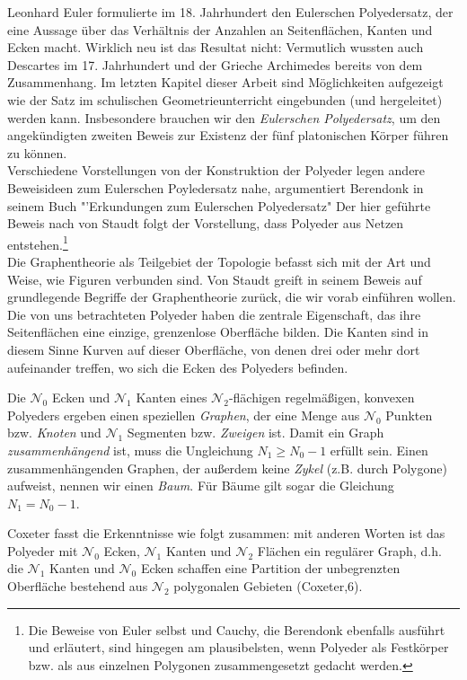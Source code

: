 Leonhard Euler formulierte im 18. Jahrhundert den Eulerschen Polyedersatz, der eine Aussage über das Verhältnis der Anzahlen an Seitenflächen, Kanten und Ecken macht. Wirklich neu ist das Resultat nicht: Vermutlich wussten auch Descartes im 17. Jahrhundert und der Grieche Archimedes bereits von dem Zusammenhang. Im letzten Kapitel dieser Arbeit sind Möglichkeiten aufgezeigt wie der Satz im schulischen Geometrieunterricht eingebunden (und hergeleitet) werden kann. Insbesondere brauchen wir den \textit{Eulerschen Polyedersatz}, um den angekündigten zweiten Beweis zur Existenz der fünf platonischen Körper führen zu können.\\
Verschiedene Vorstellungen von der Konstruktion der Polyeder legen andere Beweisideen zum Eulerschen Poyledersatz nahe, argumentiert Berendonk in seinem Buch "'Erkundungen zum Eulerschen Polyedersatz" \citep[vgl.][39]{Berendonk2014} Der hier geführte Beweis nach von Staudt folgt der Vorstellung, dass Polyeder aus Netzen entstehen.\footnote{Die Beweise von Euler selbst und Cauchy, die Berendonk ebenfalls ausführt und erläutert, sind hingegen am plausibelsten, wenn Polyeder als Festkörper bzw. als aus einzelnen Polygonen zusammengesetzt gedacht werden.}\\
Die Graphentheorie als Teilgebiet der Topologie befasst sich mit der Art und Weise, wie Figuren verbunden sind. Von Staudt greift in seinem Beweis auf grundlegende Begriffe der Graphentheorie zurück, die wir vorab einführen wollen. Die von uns betrachteten Polyeder haben die zentrale Eigenschaft, das ihre Seitenflächen eine einzige, grenzenlose Oberfläche bilden. Die Kanten sind in diesem Sinne Kurven auf dieser Oberfläche, von denen drei oder mehr dort aufeinander treffen, wo sich die Ecken des Polyeders befinden. 
\begin{bem} 
Die $\mathcal{N}_0$ Ecken und $\mathcal{N}_1$ Kanten eines $\mathcal{N}_2$-flächigen regelmäßigen, konvexen Polyeders ergeben einen speziellen \textit{Graphen}, der eine Menge aus $\mathcal{N}_0$ Punkten bzw. \textit{Knoten} und $\mathcal{N}_1$ Segmenten bzw. \textit{Zweigen} ist. Damit ein Graph \textit{zusammenhängend} ist, muss die Ungleichung $N_{1} \geq N_{0}-1$ erfüllt sein. 
Einen zusammenhängenden Graphen, der außerdem keine \textit{Zykel} (z.B. durch Polygone) aufweist, nennen wir einen \textit{Baum}. Für Bäume gilt sogar die Gleichung $N_{1} = N_{0}-1$. 
\end{bem}
Coxeter fasst die Erkenntnisse wie folgt zusammen: mit anderen Worten ist das Polyeder mit $\mathcal{N}_0$ Ecken, $\mathcal{N}_1$ Kanten und $\mathcal{N}_2$ Flächen ein regulärer Graph, d.h. die $\mathcal{N}_1$ Kanten und $\mathcal{N}_0$ Ecken schaffen eine Partition der unbegrenzten Oberfläche bestehend aus $\mathcal{N}_2$ polygonalen Gebieten (Coxeter,6).\\
